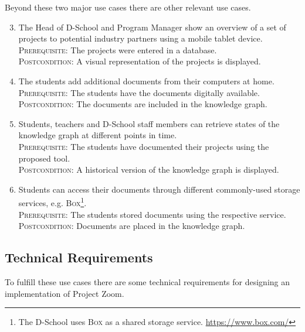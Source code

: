 Beyond these two major use cases there are other relevant use cases.

\begin{enumerate}
\setcounter{enumi}{2}

\item The Head of D-School and Program Manager show an overview of a set of projects to potential industry partners using a mobile tablet device.\\
\textsc{Prerequisite}: The projects were entered in a database.\\
\textsc{Postcondition}: A visual representation of the projects is displayed.

\item The students add additional documents from their computers at home.\\
\textsc{Prerequisite}: The students have the documents digitally available.\\
\textsc{Postcondition}: The documents are included in the knowledge graph.

\item Students, teachers and D-School staff members can retrieve states of the knowledge graph at different points in time.\\
\textsc{Prerequisite}: The students have documented their projects using the proposed tool.\\
\textsc{Postcondition}: A historical version of the knowledge graph is displayed.

\item Students can access their documents through different commonly-used storage services, e.g. \textsc{Box}\footnote{The D-School uses \textsc{Box} as a shared storage service. \url{https://www.box.com/}}.\\
\textsc{Prerequisite}: The students stored documents using the respective service.\\
\textsc{Postcondition}: Documents are placed in the knowledge graph.
\end{enumerate}

\subsection{Technical Requirements}

To fulfill these use cases there are some technical requirements for designing an implementation of Project Zoom.

